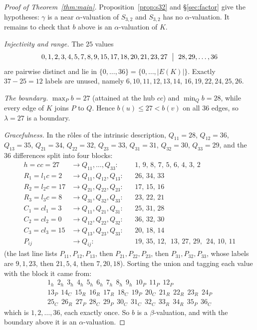\documentclass[11pt]{amsart}
\theoremstyle{definition}
\theoremstyle{remark}
\begin{document}
\begin{proof}[Proof of Theorem~\ref{thm:main}]
Proposition~\ref{prop:s32} and \S\ref{sec:factor} give the hypotheses: $\gamma$
is a near $\alpha$-valuation of $S_{3,2}$ and $S_{3,2}$ has no
$\alpha$-valuation. It remains to check that $b$ above is an
$\alpha$-valuation of $K$.

\emph{Injectivity and range.} The $25$ values
\[
 0,1,2,3,4,5,7,8,9,15,17,18,20,21,23,27\ \bigm|\ 28,29,\dots,36
\]
are pairwise distinct and lie in $\{0,\dots,36\}=\{0,\dots,|E(K)|\}$. Exactly
$37-25=12$ labels are unused, namely
$6,10,11,12,13,14$, $16,19,22,24,25,26$.

\emph{The boundary.} $\max_P b=27$ (attained at the hub $cc$) and
$\min_Q b=28$, while every edge of $K$ joins $P$ to $Q$. Hence
$b(u)\le 27<b(v)$ on all $36$ edges, so $\lambda=27$ is a boundary.

\emph{Gracefulness.} In the r\^oles of the intrinsic description,
$Q_{11}=28$, $Q_{12}=36$, $Q_{13}=35$, $Q_{21}=34$, $Q_{22}=32$, $Q_{23}=33$,
$Q_{31}=31$, $Q_{32}=30$, $Q_{33}=29$, and the $36$ differences split into
four blocks:
\begin{align*}
 h=cc=27     &\to Q_{11},\dots,Q_{33}: & &1,\,9,\,8,\,7,\,5,\,6,\,4,\,3,\,2\\
 R_1=l_1c=2  &\to Q_{11},Q_{12},Q_{13}: & &26,\,34,\,33\\
 R_2=l_2c=17 &\to Q_{21},Q_{22},Q_{23}: & &17,\,15,\,16\\
 R_3=l_3c=8  &\to Q_{31},Q_{32},Q_{33}: & &23,\,22,\,21\\
 C_1=cl_1=3  &\to Q_{11},Q_{21},Q_{31}: & &25,\,31,\,28\\
 C_2=cl_2=0  &\to Q_{12},Q_{22},Q_{32}: & &36,\,32,\,30\\
 C_3=cl_3=15 &\to Q_{13},Q_{23},Q_{33}: & &20,\,18,\,14\\
 P_{ij}      &\to Q_{ij}: & &19,\,35,\,12,\ \ 13,\,27,\,29,\ \ 24,\,10,\,11
\end{align*}
(the last line lists $P_{11},P_{12},P_{13}$, then $P_{21},P_{22},P_{23}$, then
$P_{31},P_{32},P_{33}$, whose labels are $9,1,23$, then $21,5,4$, then
$7,20,18$). Sorting the union and tagging each value with the block it came
from:
\[
\begin{array}{l}
 1_h\ \ 2_h\ \ 3_h\ \ 4_h\ \ 5_h\ \ 6_h\ \ 7_h\ \ 8_h\ \ 9_h\ \ 10_P\ \ 11_P\
 \ 12_P\\
 13_P\ \ 14_C\ \ 15_R\ \ 16_R\ \ 17_R\ \ 18_C\ \ 19_P\ \ 20_C\ \ 21_R\ \ 22_R\
 \ 23_R\ \ 24_P\\
 25_C\ \ 26_R\ \ 27_P\ \ 28_C\ \ 29_P\ \ 30_C\ \ 31_C\ \ 32_C\ \ 33_R\ \ 34_R\
 \ 35_P\ \ 36_C
\end{array}
\]
which is $1,2,\dots,36$, each exactly once. So $b$ is a $\beta$-valuation, and
with the boundary above it is an $\alpha$-valuation.
\end{proof}
\end{document}
